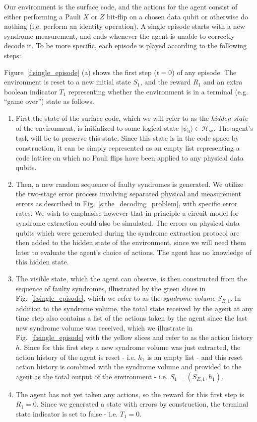 \documentclass[twocolumn,preprintnumbers,amsmath,amssymb,notitlepage,nofootinbib,longbibliography,superscriptaddress,aps,pra,10pt]{revtex4-1}
\begin{document}
	Our environment is the surface code, and the actions for the agent consist of either performing a Pauli $X$ or $Z$ bit-flip on a chosen data qubit or otherwise do nothing (i.e. perform
	an identity operation). A single episode starts with a new syndrome measurement,
	and ends whenever the agent is unable to correctly decode it. To be more specific, each episode is played according to the following steps:

	Figure~\ref{f:single_episode} (a) shows the first step ($t=0$) of any episode. The environment is reset to a new initial state $S_1$, and the reward $R_1$ and an extra
	boolean indicator $T_1$ representing whether the environment is in a terminal (e.g. ``game over'') state as follows.
	\begin{enumerate}
		\item First the state of the surface code, which we will refer to as the \textit{hidden state} of the environment, is initialized to some logical state
		$|\psi_0\rangle \in \mathcal{H_\mathrm{sc}}$. The agent's task will be to preserve this state. Since this state is in the code space by construction, it can be simply
		represented as an empty list representing a code lattice on which no Pauli flips have been applied to any physical data qubits.

		\item Then, a new random sequence of faulty syndromes is generated. We utilize the two-stage error process involving separated physical and measurement errors
		as described in Fig.~\ref{s:the_decoding_problem}, with specific error rates. We wish to emphasise however that in principle a circuit model for syndrome extraction could also be simulated.
		The errors on physical data qubits which were generated during the syndrome extraction protocol are then added to the hidden state of the environment, since we will need them
		later to evaluate the agent's choice of actions. The agent has no knowledge of this hidden state.

		\item The visible state, which the agent can observe, is then constructed from the sequence of faulty syndromes, illustrated by the green slices in Fig.~\ref{f:single_episode}, which we refer to
		as the \textit {syndrome volume} $S_{E,1}$. In addition to the syndrome volume, the total state received by the agent at any time step also contains a list of the actions taken by the agent since
		the last new syndrome volume was received, which we illustrate in Fig.~\ref{f:single_episode} with the yellow slices and refer to as the action history $h$.
		Since for this first step a new syndrome volume was just extracted, the action history of the agent is reset - i.e. $h_1$ is an empty list - and this reset action history is
		combined with the syndrome volume and provided to the agent as the total output of the environment - i.e. $S_1 = (S_{E,1},h_1)$.

		\item The agent has not yet taken any actions, so the reward for this first step is $R_1 =0$. Since we generated a state with errors by construction, the terminal state indicator is
		set to false - i.e. $T_1=0$.
	\end{enumerate}
\end{document}
